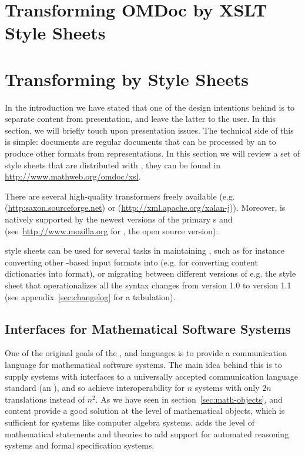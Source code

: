\ifpdf\section{Transforming OMDoc by XSLT Style Sheets}
\else\section{Transforming {\omdoc} by {\xslt} Style Sheets}\fi
\label{sec:transform-xsl}

In the introduction we have stated that one of the design intentions behind
{\omdoc} is to separate content from presentation, and leave the latter to the
user. In this section, we will briefly touch upon presentation issues. The
technical side of this is simple: {\omdoc} documents are regular {\xml} documents
that can be processed by an {\xslt} {} to produce other
formats from {\omdoc} representations. In this section we will review a set of
{\xslt} style sheets that are distributed with {\omdoc}, they can be found in
{\url{http://www.mathweb.org/omdoc/xsl}}.

There are several high-quality {\xslt} transformers freely available
(e.g.  {} ({\url{http:saxon.sourceforge.net}}) or
{} ({\url{http://xml.apache.org/xalan-j}})).  Moreover,
{\xslt} is natively supported by the newest versions of the primary
{}s {\msie} and
{\netscape} (see~{\url{http://www.mozilla.org}} for
{\mozilla}, the open source version).

{\xslt} style sheets can be used for several tasks in maintaining {\omdoc}, such as
for instance converting other {\xml}-based input formats into {\omdoc} (e.g.
{} for converting {\openmath} content
dictionaries into {\omdoc} format), or migrating between
different versions of {\omdoc} e.g. the style sheet {}
that operationalizes all the syntax changes from {\omdoc} version 1.0 to version
1.1 (see appendix~\ref{sec:changelog} for a tabulation).

\subsection{{\else{\omdoc}\fi} Interfaces for Mathematical Software
  Systems}\label{sec:omdoc2sys}

One of the original goals of the {\openmath}, {\mathml} and {\omdoc} languages is
to provide a communication language for mathematical software systems. The main
idea behind this is to supply systems with interfaces to a universally accepted
communication language standard (an {}), and so achieve
interoperability for $n$ systems with only $2n$ translations instead of $n^2$. As
we have seen in section~\ref{sec:math-objects}, {\openmath} and content {\mathml}
provide a good solution at the level of mathematical objects, which is sufficient
for systems like computer algebra systems. {\omdoc} adds the level of mathematical
statements and theories to add support for automated reasoning systems and formal
specification systems.

